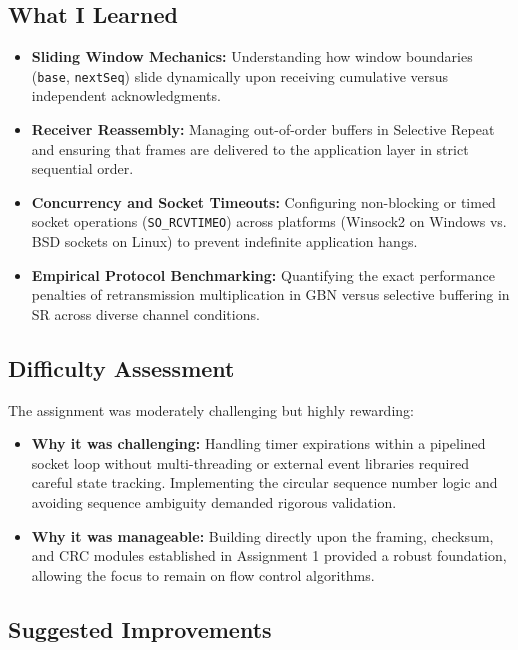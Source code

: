\documentclass[11pt,a4paper]{article}
\begin{document}
\subsection{What I Learned}

\begin{itemize}
    \item \textbf{Sliding Window Mechanics:} Understanding how window boundaries (\texttt{base}, \texttt{nextSeq}) slide dynamically upon receiving cumulative versus independent acknowledgments.
    \item \textbf{Receiver Reassembly:} Managing out-of-order buffers in Selective Repeat and ensuring that frames are delivered to the application layer in strict sequential order.
    \item \textbf{Concurrency and Socket Timeouts:} Configuring non-blocking or timed socket operations (\texttt{SO\_RCVTIMEO}) across platforms (Winsock2 on Windows vs. BSD sockets on Linux) to prevent indefinite application hangs.
    \item \textbf{Empirical Protocol Benchmarking:} Quantifying the exact performance penalties of retransmission multiplication in GBN versus selective buffering in SR across diverse channel conditions.
\end{itemize}

\subsection{Difficulty Assessment}

The assignment was moderately challenging but highly rewarding:
\begin{itemize}
    \item \textbf{Why it was challenging:} Handling timer expirations within a pipelined socket loop without multi-threading or external event libraries required careful state tracking. Implementing the circular sequence number logic and avoiding sequence ambiguity demanded rigorous validation.
    \item \textbf{Why it was manageable:} Building directly upon the framing, checksum, and CRC modules established in Assignment 1 provided a robust foundation, allowing the focus to remain on flow control algorithms.
\end{itemize}

\subsection{Suggested Improvements}
\end{document}
